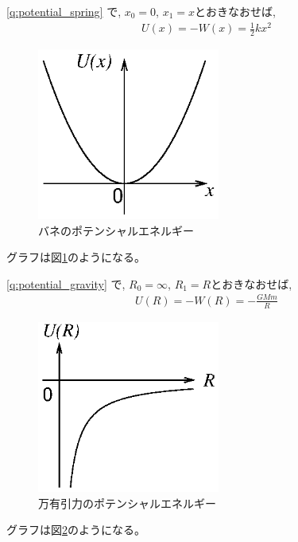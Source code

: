 % 
\ref{q:potential_spring}
で, $x_0=0$, $x_1=x$とおきなおせば, 
\begin{eqnarray}
U(x)=-W(x)=\frac{1}{2}kx^2
\end{eqnarray}
\begin{figure}[h]
    \centering
    \includegraphics[width=6cm]{stringPE.eps}
    \caption{バネのポテンシャルエネルギー}\label{fig:stringPE}
\end{figure}
グラフは図\ref{fig:stringPE}のようになる。

% 
\ref{q:potential_gravity}
で, $R_0=\infty$, $R_1=R$とおきなおせば, 
\begin{eqnarray}
U(R)=-W(R)=-\frac{GMm}{R}
\end{eqnarray}
\begin{figure}[h]
    \centering
    \includegraphics[width=6cm]{gravityPE.eps}
    \caption{万有引力のポテンシャルエネルギー}\label{fig:gravityPE}
\end{figure}
グラフは図\ref{fig:gravityPE}のようになる。

